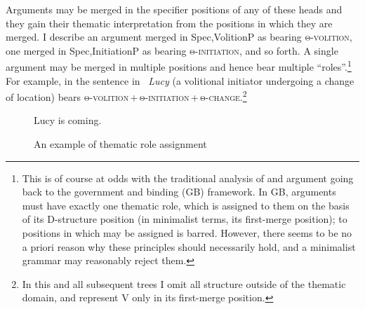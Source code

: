 \documentclass[output=paper]{langsci/langscibook}
\begin{document}
Arguments may be merged in the specifier positions of any of these heads and
they gain their thematic interpretation from the positions in which they are
merged. I describe an argument merged in Spec,VolitionP as bearing
\textsc{θ-volition}, one merged  in Spec,InitiationP as bearing
\textsc{θ-initiation}, and so forth. A single argument may be merged in
multiple positions and hence bear multiple \enquote{roles}.\footnote{This is of
    course at odds with the traditional analysis of  and argument
     going back to the government and binding (\gls{GB}) framework. In \gls{GB},
    arguments must have exactly one thematic role, which is assigned to them on
    the basis of its D-structure position (in minimalist terms, its first-merge
    position);  to positions in which  may be assigned is
barred. However, there seems to be no a priori reason why these
principles should necessarily hold, and a minimalist grammar may reasonably
reject them.} For example, in the sentence in~
\emph{Lucy} (a volitional initiator undergoing a change of location) bears
\textsc{θ-volition\,+\,θ-initiation\,+\,θ-change}.\footnote{In this and all
    subsequent trees I omit all structure outside of the thematic domain, and
represent V only in its first-merge position.}

\begin{figure}
\caption{An example of thematic role assignment\label{fig:baker:2lucy}}
\raggedright Lucy is coming.\\
\end{figure}
\end{document}
